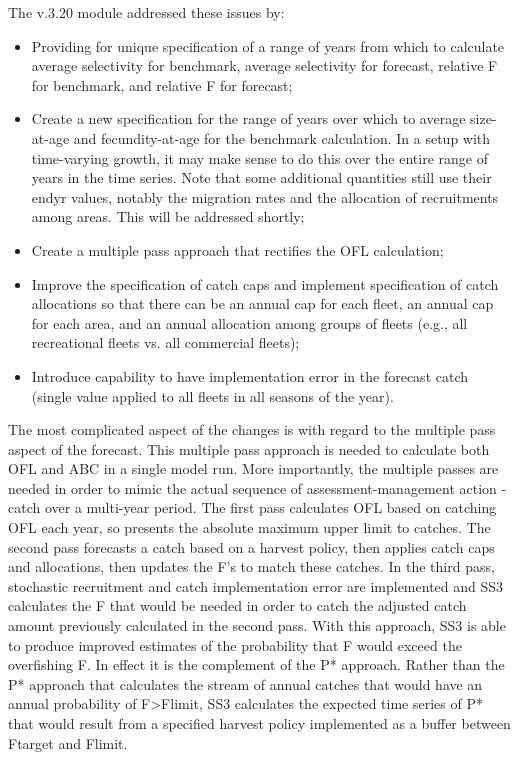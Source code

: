 The v.3.20 module addressed these issues by:
\begin{itemize}
	\item Providing for unique specification of a range of years from which to calculate average selectivity for benchmark, average selectivity for forecast, relative F for benchmark, and relative F for forecast;
	\item Create a new specification for the range of years over which to average size-at-age and fecundity-at-age for the benchmark calculation. In a setup with time-varying growth, it may make sense to do this over the entire range of years in the time series. Note that some additional quantities still use their endyr values, notably the migration rates and the allocation of recruitments among areas. This will be addressed shortly;
	\item Create a multiple pass approach that rectifies the OFL calculation;
	\item Improve the specification of catch caps and implement specification of catch allocations so that there can be an annual cap for each fleet, an annual cap for each area, and an annual allocation among groups of fleets (e.g., all recreational fleets vs. all commercial fleets);
	\item Introduce capability to have implementation error in the forecast catch (single value applied to all fleets in all seasons of the year).
\end{itemize}

The most complicated aspect of the changes is with regard to the multiple pass aspect of the forecast.  This multiple pass approach is needed to calculate both OFL and ABC in a single model run. More importantly, the multiple passes are needed in order to mimic the actual sequence of assessment-management action - catch over a multi-year period. The first pass calculates OFL based on catching OFL each year, so presents the absolute maximum upper limit to catches. The second pass forecasts a catch based on a harvest policy, then applies catch caps and allocations, then updates the F's to match these catches. In the third pass, stochastic recruitment and catch implementation error are implemented and SS3 calculates the F that would be needed in order to catch the adjusted catch amount previously calculated in the second pass. With this approach, SS3 is able to produce improved estimates of the probability that F would exceed the overfishing F. In effect it is the complement of the P* approach. Rather than the P* approach that calculates the stream of annual catches that would have an annual probability of F>Flimit, SS3 calculates the expected time series of P* that would result from a specified harvest policy implemented as a buffer between Ftarget and Flimit.


